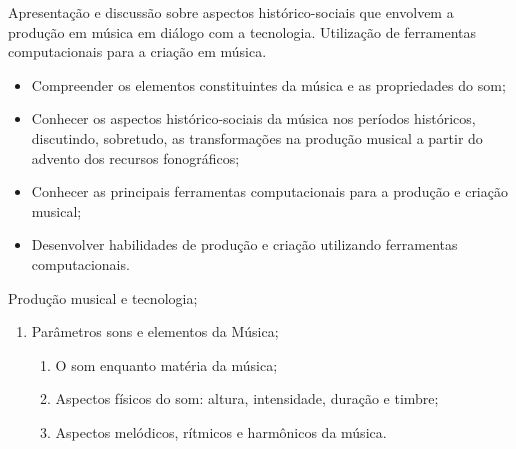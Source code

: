 


\renewcommand{\theenumi}{\arabic{enumi}}
\renewcommand{\labelenumi}{\theenumi.}
\renewcommand{\theenumii}{\arabic{enumii}}
\renewcommand{\labelenumii}{\theenumi.\theenumii}
\renewcommand{\theenumiii}{\arabic{enumiii}}
\renewcommand{\labelenumiii}{\theenumi.\theenumii.\theenumiii}
\renewcommand{\theenumiv}{\arabic{enumiv}}
\renewcommand{\labelenumiv}{\theenumi.\theenumii.\theenumiii.\theenumiv}

\begin{pud}

	
	\ementa
	Apresentação e discussão sobre aspectos histórico-sociais que envolvem a produção em música em diálogo com a tecnologia. Utilização de ferramentas computacionais para a criação em música.
	
	
	\objetivos
	\begin{itemize}[itemsep=0em, topsep=0em]
		\vspace{-1em}
		\item Compreender os elementos constituintes da música e as propriedades do som;
		\item Conhecer os aspectos histórico-sociais da música nos períodos históricos, discutindo, sobretudo, as transformações na produção musical a partir do advento dos recursos fonográficos;
		\item Conhecer as principais ferramentas computacionais para a produção e criação musical;
		\item Desenvolver habilidades de produção e criação utilizando ferramentas computacionais.
	\end{itemize}
	
	\programa
	\begin{description}[itemsep=0em]
		\item[UNIDADE I:] Produção musical e tecnologia; 
	         \begin{enumerate}[itemsep=0em, topsep=0em]
				\item Parâmetros sons e elementos da Música;
				\begin{enumerate}
                	\item O som enquanto matéria da música;
                	\item Aspectos físicos do som: altura, intensidade, duração e timbre;
					\item Aspectos melódicos, rítmicos e harmônicos da música.
                \end{enumerate}
                

\end{enumerate}
\end{description}
\end{pud}
